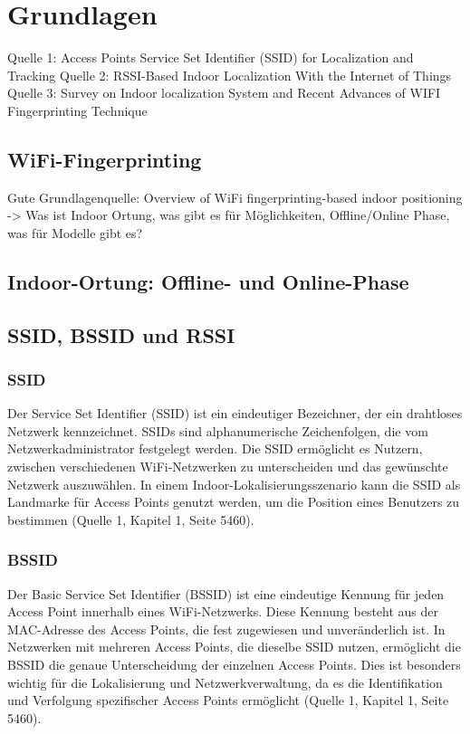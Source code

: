 \chapter{Grundlagen}

Quelle 1: Access Points Service Set Identifier (SSID) for Localization and Tracking
Quelle 2: RSSI-Based Indoor Localization With the Internet of Things
Quelle 3: Survey on Indoor localization System and Recent Advances of WIFI Fingerprinting Technique

\section{WiFi-Fingerprinting}

Gute Grundlagenquelle: Overview of WiFi ﬁngerprinting-based indoor positioning -> Was ist Indoor Ortung, was gibt es für Möglichkeiten, Offline/Online Phase, was für Modelle gibt es?

\section{Indoor-Ortung: Offline- und Online-Phase}
\section{SSID, BSSID und RSSI}


\subsection{SSID}

Der Service Set Identifier (SSID) ist ein eindeutiger Bezeichner, der ein drahtloses Netzwerk kennzeichnet. SSIDs sind alphanumerische Zeichenfolgen, die vom Netzwerkadministrator festgelegt werden. Die SSID ermöglicht es Nutzern, zwischen verschiedenen WiFi-Netzwerken zu unterscheiden und das gewünschte Netzwerk auszuwählen. In einem Indoor-Lokalisierungsszenario kann die SSID als Landmarke für Access Points genutzt werden, um die Position eines Benutzers zu bestimmen (Quelle 1, Kapitel 1, Seite 5460).

\subsection{BSSID}

Der Basic Service Set Identifier (BSSID) ist eine eindeutige Kennung für jeden Access Point innerhalb eines WiFi-Netzwerks. Diese Kennung besteht aus der MAC-Adresse des Access Points, die fest zugewiesen und unveränderlich ist. In Netzwerken mit mehreren Access Points, die dieselbe SSID nutzen, ermöglicht die BSSID die genaue Unterscheidung der einzelnen Access Points. Dies ist besonders wichtig für die Lokalisierung und Netzwerkverwaltung, da es die Identifikation und Verfolgung spezifischer Access Points ermöglicht (Quelle 1, Kapitel 1, Seite 5460).

